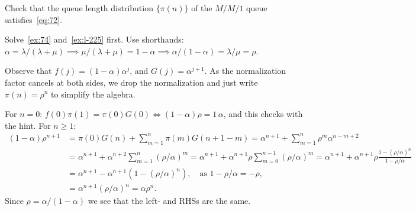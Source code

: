 \begin{exercise}\label{ex:l-229}
Check
 that the queue length distribution $\{\pi(n)\}$ of the $M/M/1$ queue satisfies~\cref{eq:72}.
\begin{hint}
Solve~\cref{ex:74} and~\cref{ex:l-225} first. Use shorthands:
$\alpha=\lambda/(\lambda+\mu) \implies \mu/(\lambda+\mu) = 1-\alpha \implies \alpha/(1-\alpha) = \lambda /\mu = \rho$.
\end{hint}
\begin{solution}
  Observe that $f(j)=(1-\alpha)\alpha^j$, and $G(j) = \alpha^{j+1}$.
  As the normalization factor cancels at both sides, we drop the normalization and  just write $\pi(n) = \rho^n$ to simplify the algebra.

For $n=0$: $f(0) \pi(1) = \pi(0) G(0) \iff (1-\alpha) \rho  = 1\, \alpha$, and this checks with the hint.
For $n\geq 1$:
\begin{align*}
 (1-\alpha)\rho^{n+1}
&= \pi(0) G(n) + \sum_{m=1}^n\pi(m) G(n+1-m)
=\alpha^{n+1} + \sum_{m=1}^n \rho^m \alpha^{n-m+2} \\
&= \alpha^{n+1} + \alpha^{n+2}\sum_{m=1}^n (\rho/\alpha)^m
= \alpha^{n+1} + \alpha^{n+1}\rho \sum_{m=0}^{n-1} (\rho/\alpha)^m
= \alpha^{n+1} + \alpha^{n+1}\rho \frac{1-(\rho/\alpha)^n}{1-\rho/\alpha}\\
&= \alpha^{n+1} - \alpha^{n+1}(1-(\rho/\alpha)^n), \quad\text{as } 1- \rho/\alpha = -\rho,\\
&= \alpha^{n+1}(\rho/\alpha)^n = \alpha \rho^n.
\end{align*}
Since $\rho=\alpha/(1-\alpha)$ we see that the left- and RHSs are the same.
\end{solution}
\end{exercise}




